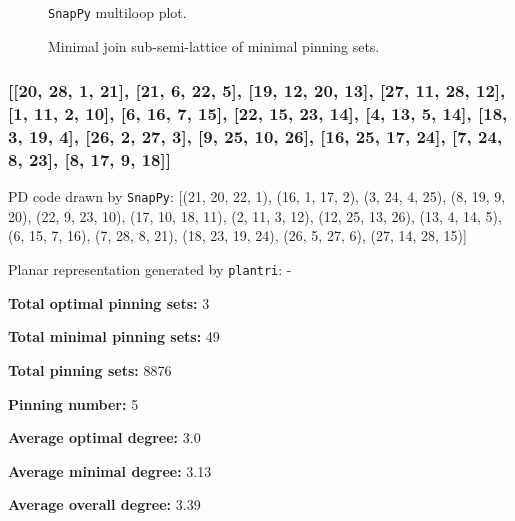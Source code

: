 \documentclass{article}%
\begin{document}
\begin{multicols}{2}
\begin{figure}[H]
\centering

\caption{\texttt{SnapPy} multiloop plot.}
\label{fig:tex/img/[[9, 28, 10, 1], [17, 8, 18, 9], [18, 27, 19, 28], [10, 19, 11, 20], [1, 20, 2, 21], [25, 16, 26, 17], [26, 7, 27, 8], [11, 3, 12, 2], [21, 12, 22, 13], [5, 24, 6, 25], [6, 15, 7, 16], [3, 23, 4, 22],.svg}
\end{figure}
\columnbreak

\begin{figure}[H]
\centering
\scalebox{0.8}{}
\caption{Minimal join sub-semi-lattice of minimal pinning sets.}
\label{fig:tex/img/[[9, 28, 10, 1], [17, 8, 18, 9], [18, 27, 19, 28], [10, 19, 11, 20], [1, 20, 2, 21], [25, 16, 26, 17], [26, 7, 27, 8], [11, 3, 12, 2], [21, 12, 22, 13], [5, 24, 6, 25], [6, 15, 7, 16], [3, 23, 4, 22],.pgf}
\end{figure}
\end{multicols}

\newpage

\subsubsection{[[20, 28, 1, 21], [21, 6, 22, 5], [19, 12, 20, 13], [27, 11, 28, 12], [1, 11, 2, 10], [6, 16, 7, 15], [22, 15, 23, 14], [4, 13, 5, 14], [18, 3, 19, 4], [26, 2, 27, 3], [9, 25, 10, 26], [16, 25, 17, 24], [7, 24, 8, 23], [8, 17, 9, 18]]}

{\small\noindent PD code drawn by \texttt{SnapPy}: [(21, 20, 22, 1), (16, 1, 17, 2), (3, 24, 4, 25), (8, 19, 9, 20), (22, 9, 23, 10), (17, 10, 18, 11), (2, 11, 3, 12), (12, 25, 13, 26), (13, 4, 14, 5), (6, 15, 7, 16), (7, 28, 8, 21), (18, 23, 19, 24), (26, 5, 27, 6), (27, 14, 28, 15)]}

{\small\noindent Planar representation generated by \texttt{plantri}: -}

\begin{multicols}{2}
{\normalsize \noindent\textbf{Total optimal pinning sets:} 3

\noindent\textbf{Total minimal pinning sets:} 49

\noindent\textbf{Total pinning sets:} 8876

\noindent\textbf{Pinning number:} 5

}
\columnbreak

{\normalsize \noindent\textbf{Average optimal degree:} 3.0

\noindent\textbf{Average minimal degree:} 3.13

\noindent\textbf{Average overall degree:} 3.39

}
\end{multicols}
\end{document}
